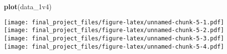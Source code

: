 \documentclass[
]{article}
\newenvironment{Shaded}{\begin{snugshade}}{\end{snugshade}}
\newcommand{\FunctionTok}[1]{\textcolor[rgb]{0.13,0.29,0.53}{\textbf{#1}}}
\newcommand{\NormalTok}[1]{#1}
\newcommand{\OtherTok}[1]{\textcolor[rgb]{0.56,0.35,0.01}{#1}}
\newcommand{\SpecialCharTok}[1]{\textcolor[rgb]{0.81,0.36,0.00}{\textbf{#1}}}
\begin{document}
\begin{Shaded}
\begin{Highlighting}[]
\FunctionTok{plot}\NormalTok{(data\_1v4)}
\end{Highlighting}
\end{Shaded}

\texttt{[image: final\_project\_files/figure-latex/unnamed-chunk-5-1.pdf]}
\texttt{[image: final\_project\_files/figure-latex/unnamed-chunk-5-2.pdf]}
\texttt{[image: final\_project\_files/figure-latex/unnamed-chunk-5-3.pdf]}
\texttt{[image: final\_project\_files/figure-latex/unnamed-chunk-5-4.pdf]}

\begin{Shaded}
\end{Shaded}
\end{document}
